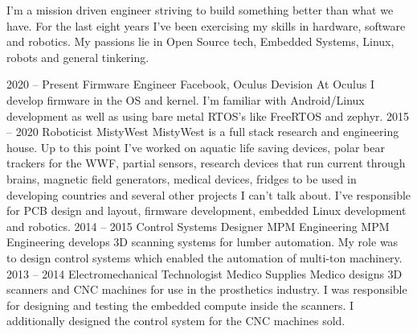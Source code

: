 \documentclass[9pt]{developercv} %
\begin{document}
\begin{minipage}[t]{0.4\textwidth} %
	\vspace{-\baselineskip} %

I'm a mission driven engineer striving to build something better than what we
have. For the last eight years I've been exercising my skills in hardware,
software and robotics. My passions lie in Open Source tech, Embedded Systems,
Linux, robots and general tinkering.  

\end{minipage}
\hfill %
\begin{minipage}[t]{0.5\textwidth} %
	\vspace{-\baselineskip} %
	\begin{barchart}{5.5}
	\end{barchart}
\end{minipage}


\begin{entrylist}
	\entry
		{2020 -- Present}
		{Firmware Engineer}
		{Facebook, Oculus Devision}
        {
        At Oculus I develop firmware in the OS and kernel. I'm familiar with
        Android/Linux development as well as using bare metal RTOS's like
        FreeRTOS and zephyr.
        }
	\entry
		{2015 -- 2020}
		{Roboticist}
		{MistyWest}
        {
        MistyWest is a full stack research and engineering house. Up to this
        point I've worked on aquatic life saving devices, polar bear trackers
        for the WWF, partial sensors, research devices that run current through
        brains, magnetic field generators, medical devices, fridges to be used
        in developing countries and several other projects I can't talk about.
        I've responsible for PCB design and layout, firmware development, embedded
        Linux development and robotics.
        }
    \entry
		{2014 -- 2015}
		{Control Systems Designer}
		{MPM Engineering}
		{
        MPM Engineering develops 3D scanning systems for lumber automation. My
        role was to design control systems which enabled the automation of
        multi-ton machinery.  
        }
	\entry
		{2013 -- 2014}
		{Electromechanical Technologist}
		{Medico Supplies}
		{
        Medico designs 3D scanners and CNC machines for use in the prosthetics
        industry. I was responsible for designing and testing the embedded
        compute inside the scanners. I additionally designed the control system
        for the CNC machines sold.
        }
\end{entrylist}
\end{document}
